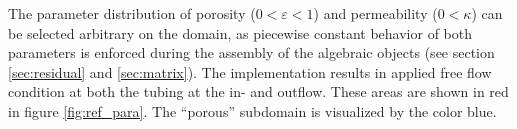 \documentclass{article}
\begin{document}
The parameter distribution of porosity ($0<\varepsilon<1$) and permeability ($0<\kappa$) can be selected arbitrary on the domain, as piecewise constant behavior of both parameters is enforced during the assembly of the algebraic objects (see section \ref{sec:residual} and \ref{sec:matrix}). The implementation results in applied free flow condition at both the tubing at the in- and outflow. These areas are shown in red in figure \ref{fig:ref_para}. The ``porous'' subdomain is visualized by the color blue.

\vspace*{40pt}
\begin{figure}[!ht]
\centering


\end{figure}
\end{document}
